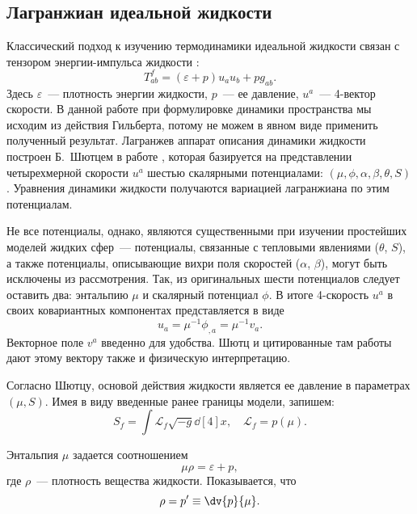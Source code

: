 \documentclass[\docroot/reports/draft/report.tex]{subfiles}
\begin{document}
\onlyinsubfile{\tableofcontents}

\subsection{Лагранжиан идеальной жидкости}

    Классический подход к изучению термодинамики идеальной жидкости связан с тензором энергии-импульса жидкости \cite{tolman}:
    \begin{equation*}
        T^f_{ab} = (\varepsilon + p) u_a u_b + p g_{ab} .
    \end{equation*}
    Здесь $\varepsilon$~--- плотность энергии жидкости, $p$~--- ее давление, $u^a$~--- 4-вектор скорости. В данной работе при формулировке динамики пространства мы исходим из действия Гильберта, потому не можем в явном виде применить полученный результат. Лагранжев аппарат описания динамики жидкости построен Б.~Шютцем в работе \cite{schutz_vel_pot}, которая базируется на представлении четырехмерной скорости $u^a$ шестью скалярными потенциалами: $(\mu,\phi,\alpha,\beta,\theta,S)$. Уравнения динамики жидкости получаются вариацией лагранжиана по этим потенциалам.

    Не все потенциалы, однако, являются существенными при изучении простейших моделей жидких сфер~--- потенциалы, связанные с тепловыми явлениями ($\theta$, $S$), а также потенциалы, описывающие вихри поля скоростей ($\alpha$, $\beta$), могут быть исключены из рассмотрения. Так, из оригинальных шести потенциалов следует оставить два: энтальпию $\mu$ и скалярный потенциал $\phi$. В итоге 4-скорость $u^a$ в своих ковариантных компонентах представляется в виде
    \begin{equation*}
        u_a = \mu^{-1} \phi_{,a} = \mu^{-1} v_a .
    \end{equation*}
    Векторное поле $v^a$ введенно для удобства. Шютц \cite{schutz_vel_pot} и цитированные там работы дают этому вектору также и физическую интерпретацию.

    Согласно Шютцу, основой действия жидкости является ее давление в параметрах $(\mu,S)$. Имея в виду введенные ранее границы модели, запишем:
    \begin{equation}
        S_f = \int \mathcal{L}_f \sqrt{-g} \dd[4]{x} , \quad
        \mathcal{L}_f = p(\mu) .
    \end{equation}

    Энтальпия $\mu$ задается соотношением
    \begin{equation*}
        \mu\rho = \varepsilon + p ,
    \end{equation*}
    где $\rho$~--- плотность вещества жидкости. Показывается, что
    \begin{equation*}
        \rho = p' \equiv \dv{p}{\mu} .
    \end{equation*}
\end{document}
